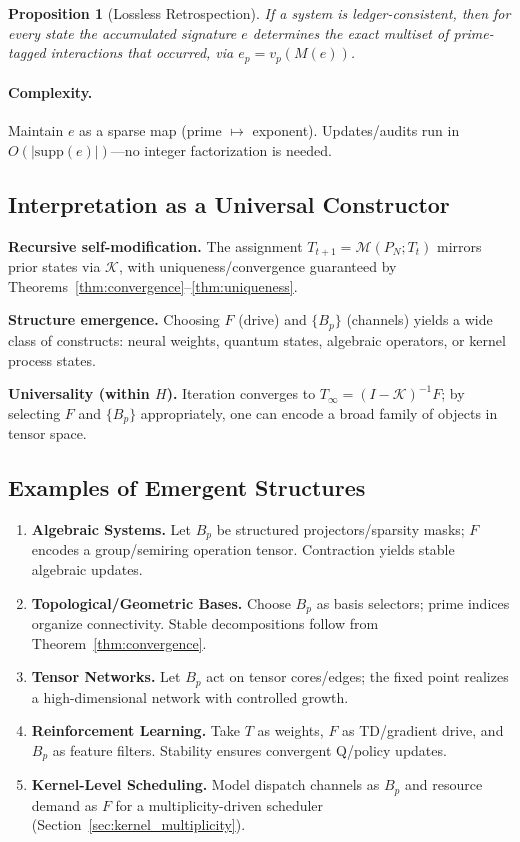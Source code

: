 \documentclass[11pt]{article}
\theoremstyle{plain}
\newtheorem{proposition}[theorem]{Proposition}
\theoremstyle{definition}
\theoremstyle{remark}
\begin{document}
\begin{proposition}[Lossless Retrospection]
If a system is ledger-consistent, then for every state the accumulated signature $e$ determines the exact multiset of prime-tagged interactions that occurred, via $e_p=v_p(M(e))$.
\end{proposition}

\paragraph{Complexity.}
Maintain $e$ as a sparse map (prime $\mapsto$ exponent). Updates/audits run in $O(|\mathrm{supp}(e)|)$—no integer factorization is needed.

\subsection{Interpretation as a Universal Constructor}
\label{subsec:universal_constructor}
\textbf{Recursive self-modification.} The assignment $T_{t+1}=\mathcal{M}(P_N;T_t)$ mirrors prior states via $\mathcal{K}$, with uniqueness/convergence guaranteed by Theorems~\ref{thm:convergence}–\ref{thm:uniqueness}.

\textbf{Structure emergence.} Choosing $F$ (drive) and $\{B_p\}$ (channels) yields a wide class of constructs: neural weights, quantum states, algebraic operators, or kernel process states.

\textbf{Universality (within $H$).} Iteration converges to $T_\infty=(I-\mathcal{K})^{-1}F$; by selecting $F$ and $\{B_p\}$ appropriately, one can encode a broad family of objects in tensor space.

\subsection{Examples of Emergent Structures}
\begin{enumerate}
  \item \textbf{Algebraic Systems.} Let $B_p$ be structured projectors/sparsity masks; $F$ encodes a group/semiring operation tensor. Contraction yields stable algebraic updates.
  \item \textbf{Topological/Geometric Bases.} Choose $B_p$ as basis selectors; prime indices organize connectivity. Stable decompositions follow from Theorem~\ref{thm:convergence}.
  \item \textbf{Tensor Networks.} Let $B_p$ act on tensor cores/edges; the fixed point realizes a high-dimensional network with controlled growth.
  \item \textbf{Reinforcement Learning.} Take $T$ as weights, $F$ as TD/gradient drive, and $B_p$ as feature filters. Stability ensures convergent Q/policy updates.
  \item \textbf{Kernel-Level Scheduling.} Model dispatch channels as $B_p$ and resource demand as $F$ for a multiplicity-driven scheduler (Section~\ref{sec:kernel_multiplicity}).
\end{enumerate}
\end{document}
